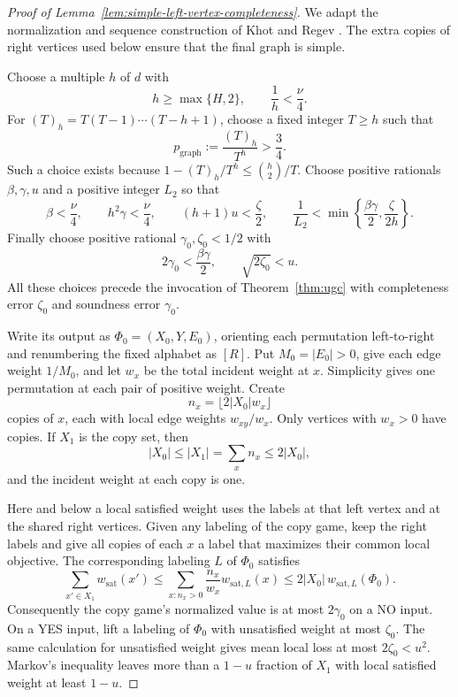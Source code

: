 \begin{proof}[Proof of Lemma~\ref{lem:simple-left-vertex-completeness}]
We adapt the normalization and sequence construction of Khot and Regev
\cite[Lemmas~3.3, 3.4, and~3.6]{KhotRegev2008}.  The extra copies of
right vertices used below ensure that the final graph is simple.

Choose a multiple \(h\) of \(d\) with
\[
 h\ge\max\{H,2\},\qquad \frac1h<\frac{\nu}{4}.
\]
For \((T)_h=T(T-1)\cdots(T-h+1)\), choose a fixed integer \(T\ge h\)
such that
\[
 p_{\mathrm{graph}}:=\frac{(T)_h}{T^h}>\frac34.
\]
Such a choice exists because \(1-(T)_h/T^h\le\binom h2/T\).
Choose positive rationals \(\beta,\gamma,u\) and a positive integer
\(L_2\) so that
\[
 \beta<\frac{\nu}{4},\qquad
 h^2\gamma<\frac{\nu}{4},\qquad
 (h+1)u<\frac{\zeta}{2},\qquad
 \frac1{L_2}<\min\left\{\frac{\beta\gamma}{2},
                            \frac{\zeta}{2h}\right\}.
\]
Finally choose positive rational \(\gamma_0,\zeta_0<1/2\) with
\[
 2\gamma_0<\frac{\beta\gamma}{2},
 \qquad \sqrt{2\zeta_0}<u.
\]
All these choices precede the invocation of
Theorem~\ref{thm:ugc} with completeness error \(\zeta_0\) and soundness
error \(\gamma_0\).

Write its output as \(\Phi_0=(X_0,Y,E_0)\), orienting each permutation
left-to-right and renumbering the fixed alphabet as \([R]\).
Put \(M_0=|E_0|>0\), give each edge weight \(1/M_0\), and let \(w_x\)
be the total incident weight at \(x\).  Simplicity gives one permutation
at each pair of positive weight.  Create
\[
 n_x=\lfloor 2|X_0|w_x\rfloor
\]
copies of \(x\), each with local edge weights \(w_{xy}/w_x\).
Only vertices with \(w_x>0\) have copies.  If \(X_1\) is the copy set,
then
\[
 |X_0|\le |X_1|=\sum_x n_x\le2|X_0|,
\]
and the incident weight at each copy is one.

Here and below a local satisfied weight uses the labels at that left
vertex and at the shared right vertices.  Given any labeling of the
copy game, keep the right labels and give all copies of each \(x\) a
label that maximizes their common local objective.  The corresponding
labeling \(L\) of \(\Phi_0\) satisfies
\[
 \sum_{x'\in X_1} w_{\mathrm{sat}}(x')
 \le
 \sum_{x:n_x>0}\frac{n_x}{w_x}w_{\mathrm{sat},L}(x)
 \le 2|X_0|\,w_{\mathrm{sat},L}(\Phi_0).
\]
Consequently the copy game's normalized value is at most
\(2\gamma_0\) on a NO input.  On a YES input, lift a labeling of
\(\Phi_0\) with unsatisfied weight at most \(\zeta_0\).  The same
calculation for unsatisfied weight gives mean local loss at most
\(2\zeta_0<u^2\).  Markov's inequality leaves more than a \(1-u\)
fraction of \(X_1\) with local satisfied weight at least \(1-u\).


\end{proof}
